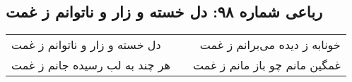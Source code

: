 \begin{center}
\section*{رباعی شماره ۹۸: دل خسته و زار و ناتوانم ز غمت}
\label{sec:sh098}
\begin{longtable}{l p{0.5cm} r}
دل خسته و زار و ناتوانم ز غمت
&&
خونابه ز دیده می‌برانم ز غمت
\\
هر چند به لب رسیده جانم ز غمت
&&
غمگین مانم چو باز مانم ز غمت
\\
\end{longtable}
\end{center}
